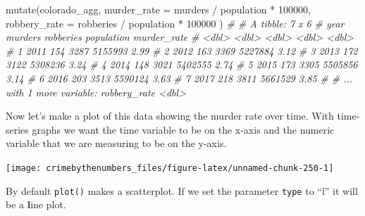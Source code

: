 \documentclass[
  a4paper,
]{krantz}
\makeatletter
\newenvironment{Shaded}{\begin{snugshade}}{\end{snugshade}}
\newcommand{\AttributeTok}[1]{\textcolor[rgb]{0.61,0.61,0.61}{#1}}
\newcommand{\CommentTok}[1]{\textcolor[rgb]{0.37,0.37,0.37}{\textit{#1}}}
\newcommand{\DecValTok}[1]{\textcolor[rgb]{0.06,0.06,0.06}{#1}}
\newcommand{\FunctionTok}[1]{\textcolor[rgb]{0,0,0}{#1}}
\newcommand{\NormalTok}[1]{#1}
\newcommand{\SpecialCharTok}[1]{\textcolor[rgb]{0,0,0}{#1}}
\newcommand{\StringTok}[1]{\textcolor[rgb]{0.5,0.5,0.5}{#1}}
\newenvironment{kframe}{%
\medskip{}
\setlength{\fboxsep}{.8em}
 \def\at@end@of@kframe{}%
 \ifinner\ifhmode%
  \def\at@end@of@kframe{\end{minipage}}%
  \begin{minipage}{\columnwidth}%
 \fi\fi%
 \def\FrameCommand##1{\hskip\@totalleftmargin \hskip-\fboxsep
 \colorbox{shadecolor}{##1}\hskip-\fboxsep
     \hskip-\linewidth \hskip-\@totalleftmargin \hskip\columnwidth}%
 \MakeFramed {\advance\hsize-\width
   \@totalleftmargin\z@ \linewidth\hsize
   \@setminipage}}%
 {\par\unskip\endMakeFramed%
 \at@end@of@kframe}
\renewenvironment{Shaded}{\begin{kframe}}{\end{kframe}}
\makeatother
\begin{document}
\begin{Shaded}
\begin{Highlighting}[]
\FunctionTok{mutate}\NormalTok{(colorado\_agg,}
  \AttributeTok{murder\_rate  =}\NormalTok{ murders }\SpecialCharTok{/}\NormalTok{ population }\SpecialCharTok{*} \DecValTok{100000}\NormalTok{,}
  \AttributeTok{robbery\_rate =}\NormalTok{ robberies }\SpecialCharTok{/}\NormalTok{ population }\SpecialCharTok{*} \DecValTok{100000}
\NormalTok{)}
\CommentTok{\# \# A tibble: 7 x 6}
\CommentTok{\#    year murders robberies population murder\_rate}
\CommentTok{\#   \textless{}dbl\textgreater{}   \textless{}dbl\textgreater{}     \textless{}dbl\textgreater{}      \textless{}dbl\textgreater{}       \textless{}dbl\textgreater{}}
\CommentTok{\# 1  2011     154      3287    5155993        2.99}
\CommentTok{\# 2  2012     163      3369    5227884        3.12}
\CommentTok{\# 3  2013     172      3122    5308236        3.24}
\CommentTok{\# 4  2014     148      3021    5402555        2.74}
\CommentTok{\# 5  2015     173      3305    5505856        3.14}
\CommentTok{\# 6  2016     203      3513    5590124        3.63}
\CommentTok{\# 7  2017     218      3811    5661529        3.85}
\CommentTok{\# \# ... with 1 more variable: robbery\_rate \textless{}dbl\textgreater{}}
\end{Highlighting}
\end{Shaded}

Now let's make a plot of this data showing the murder rate
over time. With time-series graphs we want the time variable
to be on the x-axis and the numeric variable that we are
measuring to be on the y-axis.

\begin{Shaded}
\end{Shaded}

\begin{center}\texttt{[image: crimebythenumbers\_files/figure-latex/unnamed-chunk-250-1]} \end{center}

By default \texttt{plot()} makes a scatterplot. If we set
the parameter \texttt{type} to ``l'' it will be a
\textbf{l}ine plot.

\begin{Shaded}
\end{Shaded}
\end{document}
